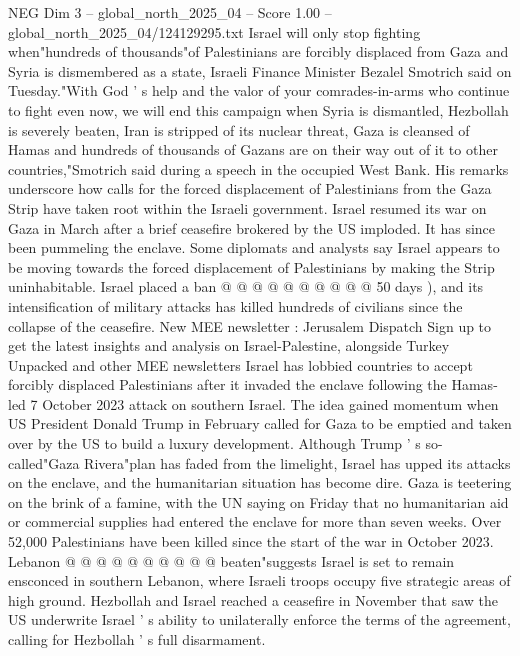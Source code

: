 \begin{textsample}{NEG Dim 3 – global\_north\_2025\_04 – Score 1.00 – global\_north\_2025\_04/124129295.txt}  \label{ex:f3_neg_413}
Israel will only stop fighting when"hundreds of thousands"of Palestinians are forcibly displaced from Gaza and Syria is dismembered as a state, Israeli Finance Minister Bezalel Smotrich said on Tuesday."With God ' s help and the valor of your comrades-in-arms who continue to fight even now, we will end this campaign when Syria is dismantled, Hezbollah is severely beaten, Iran is stripped of its nuclear threat, Gaza is cleansed of Hamas and hundreds of thousands of Gazans are on their way out of it to other countries,"Smotrich said during a speech in the occupied West Bank.
His remarks underscore how calls for the forced displacement of Palestinians from the Gaza Strip have taken root within the Israeli government.
Israel resumed its war on Gaza in March after a brief ceasefire brokered by the US imploded.
It has since been pummeling the enclave.
Some diplomats and analysts say Israel appears to be moving towards the forced displacement of Palestinians by making the Strip uninhabitable.
Israel placed a ban @ @ @ @ @ @ @ @ @ @ 50 days ), and its intensification of military attacks has killed hundreds of civilians since the collapse of the ceasefire.
New MEE newsletter : Jerusalem Dispatch Sign up to get the latest insights and analysis on Israel-Palestine, alongside Turkey Unpacked and other MEE newsletters Israel has lobbied countries to accept forcibly displaced Palestinians after it invaded the enclave following the Hamas-led 7 October 2023 attack on southern Israel.
The idea gained momentum when US President Donald Trump in February called for Gaza to be emptied and taken over by the US to build a luxury development.
Although Trump ' s so-called"Gaza Rivera"plan has faded from the limelight, Israel has upped its attacks on the enclave, and the humanitarian situation has become dire.
Gaza is teetering on the brink of a famine, with the UN saying on Friday that no humanitarian aid or commercial supplies had entered the enclave for more than seven weeks.
Over 52,000 Palestinians have been killed since the start of the war in October 2023.
Lebanon @ @ @ @ @ @ @ @ @ @ beaten"suggests Israel is set to remain ensconced in southern Lebanon, where Israeli troops occupy five strategic areas of high ground.
Hezbollah and Israel reached a ceasefire in November that saw the US underwrite Israel ' s ability to unilaterally enforce the terms of the agreement, calling for Hezbollah ' s full disarmament.

\end{textsample}
